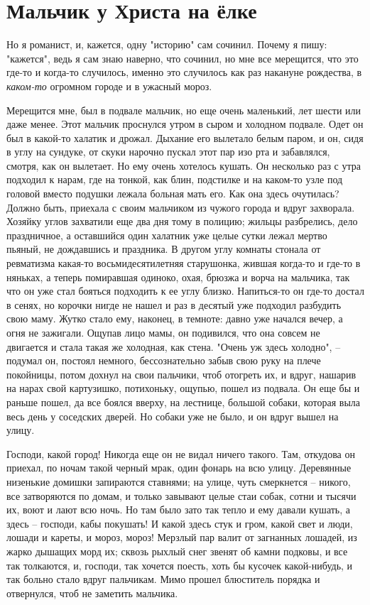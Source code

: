 \documentclass[a4paper, 12pt]{article}
\newcommand{\MyTitle}{\textbf{Мальчик у Христа на ёлке}}
\begin{document}
    \section{\MyTitle}
    
    Но я романист, и, кажется, одну "историю" сам сочинил. Почему я пишу: "кажется", ведь я сам знаю наверно, что сочинил, но мне все мерещится, что это где-то и когда-то случилось, именно это случилось как раз накануне рождества, в \textit{каком-то} огромном городе и в ужасный мороз. 
    
    \vspace{3ex}
    
    Мерещится мне, был в подвале мальчик, но еще очень маленький, лет шести или даже менее. Этот мальчик проснулся утром в сыром и холодном подвале. Одет он был в какой-то халатик и дрожал. Дыхание его вылетало белым паром, и он, сидя в углу на сундуке, от скуки нарочно пускал этот пар изо рта и забавлялся, смотря, как он вылетает. Но ему очень хотелось кушать. Он несколько раз с утра подходил к нарам, где на тонкой, как блин, подстилке и на каком-то узле под головой вместо подушки лежала больная мать его. Как она здесь очутилась? Должно быть, приехала с своим мальчиком из чужого города и вдруг захворала. Хозяйку углов захватили еще два дня тому в полицию; жильцы разбрелись, дело праздничное, а оставшийся один халатник уже целые сутки лежал мертво пьяный, не дождавшись и праздника. В другом углу комнаты стонала от ревматизма какая-то восьмидесятилетняя старушонка, жившая когда-то и где-то в няньках, а теперь помиравшая одиноко, охая, брюзжа и ворча на мальчика, так что он уже стал бояться подходить к ее углу близко. Напиться-то он где-то достал в сенях, но корочки нигде не нашел и раз в десятый уже подходил разбудить свою маму. Жутко стало ему, наконец, в темноте: давно уже начался вечер, а огня не зажигали. Ощупав лицо мамы, он подивился, что она совсем не двигается и стала такая же холодная, как стена. "Очень уж здесь холодно", -- подумал он, постоял немного, бессознательно забыв свою руку на плече покойницы, потом дохнул на свои пальчики, чтоб отогреть их, и вдруг, нашарив на нарах свой картузишко, потихоньку, ощупью, пошел из подвала. Он еще бы и раньше пошел, да все боялся вверху, на лестнице, большой собаки, которая выла весь день у соседских дверей. Но собаки уже не было, и он вдруг вышел на улицу. 
    
    Господи, какой город! Никогда еще он не видал ничего такого. Там, откудова он приехал, по ночам такой черный мрак, один фонарь на всю улицу. Деревянные низенькие домишки запираются ставнями; на улице, чуть смеркнется -- никого, все затворяются по домам, и только завывают целые стаи собак, сотни и тысячи их, воют и лают всю ночь. Но там было зато так тепло и ему давали кушать, а здесь -- господи, кабы покушать! И какой здесь стук и гром, какой свет и люди, лошади и кареты, и мороз, мороз! Мерзлый пар валит от загнанных лошадей, из жарко дышащих морд их; сквозь рыхлый снег звенят об камни подковы, и все так толкаются, и, господи, так хочется поесть, хоть бы кусочек какой-нибудь, и так больно стало вдруг пальчикам. Мимо прошел блюститель порядка и отвернулся, чтоб не заметить мальчика. 
    
\end{document}
